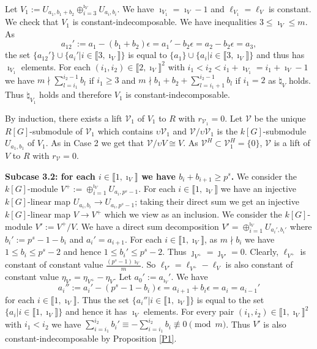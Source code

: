 \documentclass[11pt]{amsart}
\begin{document}
Let $V_1:=U_{a_1,b_1+b_2}\oplus_{i=3}^{\imath_V} 
U_{a_i,b_i}$. We have $\imath_{V_1}=\imath_V-1$ and $\ell_{V_1}=\ell_V$ is constant. We check that $V_1$ is constant-indecomposable. We have inequalities $3\le \imath_V\le m$. As 
$$a_{12}':=a_1-(b_1+b_2)\epsilon=a_1'-b_2\epsilon=a_2-b_2\epsilon=a_3,$$
the set $\{a_{12}'\}\cup\{a_i'|i\in\llbracket3,\imath_V\rrbracket\}$ is equal to $\{a_1\}\cup\{a_i|i\in\llbracket3,\imath_V\rrbracket\}$ and thus has $\imath_{V_1}$ elements. For each $(i_1,i_2)\in\llbracket2,\imath_V\rrbracket^2$ with $i_1<i_2<i_1+\imath_{V_1}=i_1+\imath_V-1$ we have $m\nmid \sum_{l=i_1}^{i_2-1} b_l$ if $i_1\ge 3$ and $m\nmid b_1+b_2+\sum_{l=i_1+1}^{i_2-1} b_l$ if $i_1=2$ as $\natural_V$ holds. Thus $\natural_{V_1}$ holds and therefore $V_1$ is constant-indecomposable.

By induction, there exists a lift $\mathcal V_1$ of $V_1$ to $R$ with $r_{\mathcal V_1}=0$. Let $\mathcal V$ be the unique $R[G]$-submodule of $\mathcal V_1$ which contains $\upsilon\mathcal V_1$ and $\mathcal V/\upsilon\mathcal V_1$ is the $k[G]$-submodule $U_{a_1,b_1}$ of $V_1$. As in Case 2 we get that $\mathcal V/\upsilon V\cong V$. As $\mathcal V^H\subset\mathcal V_1^H=\{0\}$, $\mathcal V$ is a lift of $V$ to $R$ with $r_{\mathcal V}=0$.

{\bf Subcase 3.2: for each $i\in\llbracket1,\imath_V\rrbracket$ we have $b_i+b_{i+1}\ge p^s$.} We consider the $k[G]$-module $V^+:=\oplus_{i=1}^{\imath_V} U_{a_i,p^s-1}$. For each $i\in\llbracket1,\imath_V\rrbracket$ we have an injective $k[G]$-linear map $U_{a_i,b_i}\rightarrow U_{a_i,p^s-1}$; taking their direct sum we get an injective $k[G]$-linear map $V\rightarrow V^+$ which we view as an inclusion. We consider the $k[G]$-module $V':=V^+/V$. We have a direct sum decomposition $V'=\oplus_{i=1}^{\imath_V} U_{a_i',b_i'}$ where $b_i':=p^s-1-b_i$ and $a_i'=a_{i+1}$. For each $i\in\llbracket1,\imath_V\rrbracket$, as $m\nmid b_i$ we have $1\le b_i\le p^s-2$ and hence $1\le b_i'\le p^s-2$. Thus $\jmath_{V^+}=\jmath_{V'}=0$. Clearly, $\ell_{V^+}$ is constant of constant value $\frac{(p^s-1)\imath_V}{m}$. So $\ell_{V'}=\ell_{V^+}-\ell_V$ is also constant of constant value $\eta_{V'}=\eta_{V^+}-\eta_V$. Let $a_0':=a_{\imath_V}'$. We have 
$$a_i'':=a_i'-(p^s-1-b_i)\epsilon=a_{i+1}+b_i\epsilon=a_i=a_{i-1}'$$
for each $i\in\llbracket1,\imath_V\rrbracket$. Thus the set $\{a_i''|i\in\llbracket1,\imath_V\rrbracket\}$ is equal to the set $\{a_i|i\in\llbracket1,\imath_V\rrbracket\}$ and hence it has $\imath_V$ elements.
For every pair $(i_1,i_2)\in\llbracket1,\imath_V\rrbracket^2$ with $i_1<i_2$ we have $\sum_{i=i_1}^{i_2} b_i'\equiv -\sum_{i=i_1}^{i_2} b_i\not\equiv 0\pmod{m}$. Thus $V'$ is also constant-indecomposable by Proposition \ref{P1}. 
\end{document}
